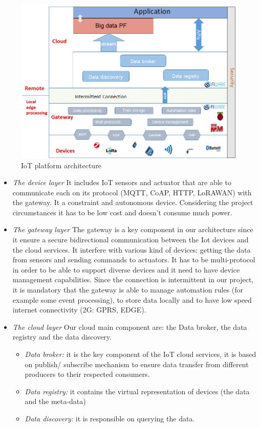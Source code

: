 \begin{figure}[h]
\centering
\includegraphics[width=\textwidth]{figs/iotarchi.png}
\caption{IoT platform architecture}
\label{fig:iotarchi}
\end{figure}

\begin{itemize}
  \item \emph{The device layer}
    It includes IoT sensors and actuator that are able to communicate each on its protocol (MQTT, CoAP, HTTP, LoRAWAN) with the gateway. 
It a constraint and autonomous device. 
Considering the project circumstances it has to be low cost and doesn’t consume much power.
  \item \emph{The gateway layer}
  The gateway is a key component in our architecture since it ensure a secure bidirectional communication between the Iot devices and the cloud services.
 It interfere with various kind of devices: getting the data from sensors and sending commands to actuators.
  It has to be multi-protocol in order to be able to support diverse devices and it need to have device management capabilities.
Since the connection is intermittent in our project, it is mandatory that the gateway is able to manage automation rules (for example some event processing), to store data locally and to have low speed internet connectivity (2G: GPRS, EDGE).
  \item \emph{The cloud layer}
  Our cloud main component are: the Data broker, the data registry and the data discovery.
\begin{itemize}
  \item \emph{Data broker:}
    it is the key component of the IoT cloud services, it is based on publish/ subscribe mechanism to ensure data transfer from different producers to their respected consumers.
  \item \emph{Data registry:}
    it contains the virtual representation of devices (the data and the meta-data)
  \item \emph{Data discovery:} 
    it is responsible on querying the data.
\end{itemize}
\end{itemize}

